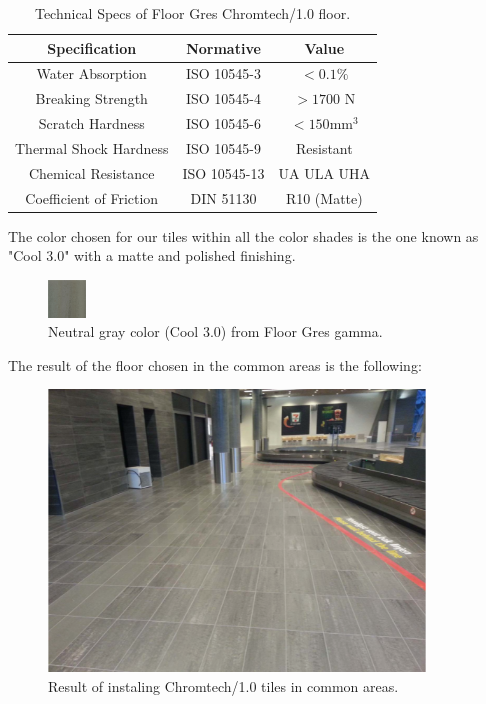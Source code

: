 	\begin{table}[ht!]
	\centering
	\begin{tabular}{|c|c|c|}
	\hline
	Specification & Normative & Value\\
	\hline
	Water Absorption & ISO 10545-3 & $<0.1\%$\\
	\hline
	Breaking Strength & ISO 10545-4 & $>1700$ N\\
	\hline
	Scratch Hardness & ISO 10545-6 & $< 150 \mathrm{mm^3}$\\
	\hline
	Thermal Shock Hardness & ISO 10545-9 & Resistant\\
	\hline
	Chemical Resistance & ISO 10545-13 & UA ULA UHA\\
	\hline
	Coefficient of Friction & DIN 51130 & R10 (Matte)\\
	\hline
	\end{tabular}
	\caption{Technical Specs of Floor Gres Chromtech/1.0 floor.}
	\end{table}
	
The color chosen for our tiles within all the color shades is the one known as "Cool 3.0" with a matte and polished finishing.
	\begin{figure}[ht!]
	\centering
\includegraphics[width=1cm]{./images/Color}
\caption{Neutral gray color (Cool 3.0) from Floor Gres gamma.}
\end{figure}

The result of the floor chosen in the common areas is the following:
\begin{figure}[ht!]
	\centering
\includegraphics[width=10cm]{./images/Resultado}
\caption{Result of instaling Chromtech/1.0 tiles in common areas.}
\end{figure}
